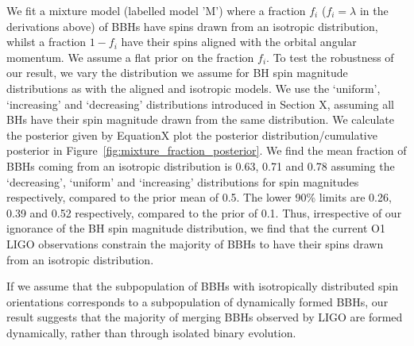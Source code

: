 \documentclass[modern]{aastex61}
\begin{document}
%

We fit a mixture model (labelled model 'M') where a fraction $f_i$ ($f_i=\lambda$ in the derivations above) of BBHs have spins drawn from an isotropic distribution, whilst a fraction $1 - f_i$ have their spins aligned with the orbital angular momentum. We assume a flat prior on the fraction $f_i$. To test the robustness of our result, we vary the distribution we assume for BH spin magnitude distributions as with the aligned and isotropic models. We use the `uniform', `increasing' and `decreasing' distributions introduced in Section X, assuming all BHs have their spin magnitude drawn from the same distribution. We calculate the posterior given by EquationX plot the posterior distribution/cumulative posterior in Figure~\ref{fig:mixture_fraction_posterior}. We find the mean fraction of BBHs coming from an isotropic distribution is 0.63, 0.71 and 0.78 assuming the `decreasing', `uniform' and `increasing' distributions for spin magnitudes respectively, compared to the prior mean of 0.5. The lower 90\% limits are 0.26, 0.39 and 0.52 respectively, compared to the prior of 0.1. Thus, irrespective of our ignorance of the BH spin magnitude distribution, we find that the current O1 LIGO observations constrain the majority of BBHs to have their spins drawn from an isotropic distribution. 

If we assume that the subpopulation of BBHs with isotropically distributed spin orientations corresponds to a subpopulation of dynamically formed BBHs, our result suggests that the majority of merging BBHs observed by LIGO are formed dynamically, rather than through isolated binary evolution.
\end{document}
